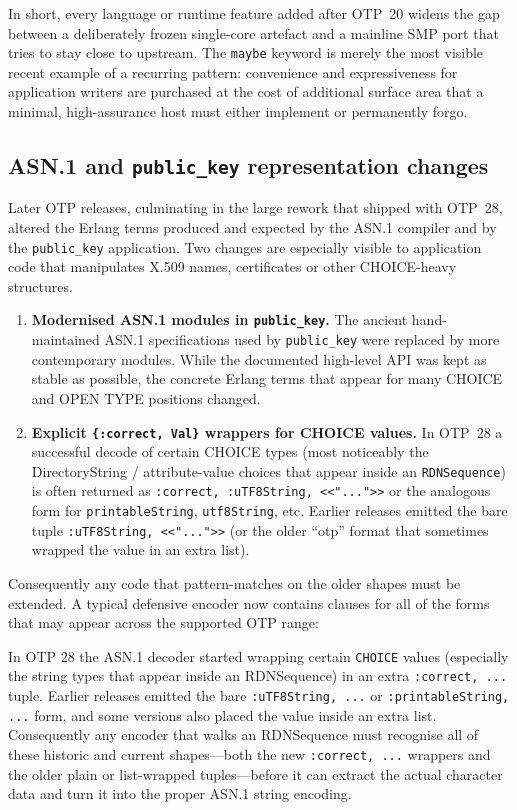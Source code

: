 \documentclass{article}
\begin{document}
In short, every language or runtime feature added after OTP~20 widens the gap between a deliberately frozen single-core artefact and a mainline SMP port that tries to stay close to upstream.
The \texttt{maybe} keyword is merely the most visible recent example of a recurring pattern: convenience and expressiveness for application writers are purchased at the cost of additional surface area that a minimal, high-assurance host must either implement or permanently forgo.

\subsection{ASN.1 and \texttt{public\_key} representation changes}

Later OTP releases, culminating in the large rework that shipped with OTP~28, altered the Erlang terms produced and expected by the ASN.1 compiler and by the \texttt{public\_key} application.
Two changes are especially visible to application code that manipulates X.509 names, certificates or other CHOICE-heavy structures.

\begin{enumerate}
  \item \textbf{Modernised ASN.1 modules in \texttt{public\_key}.}
    The ancient hand-maintained ASN.1 specifications used by \texttt{public\_key} were replaced by more contemporary modules.
    While the documented high-level API was kept as stable as possible, the concrete Erlang terms that appear for many CHOICE and OPEN TYPE positions changed.

  \item \textbf{Explicit \texttt{\{:correct, Val\}} wrappers for CHOICE values.}
    In OTP~28 a successful decode of certain CHOICE types (most noticeably the DirectoryString / attribute-value choices that appear inside an \texttt{RDNSequence}) is often returned as
    \texttt{{:correct, {:uTF8String, <<"...">>}}}
    or the analogous form for \texttt{printableString}, \texttt{utf8String}, etc.
    Earlier releases emitted the bare tuple
    \texttt{{:uTF8String, <<"...">>}}
    (or the older ``otp'' format that sometimes wrapped the value in an extra list).
\end{enumerate}

Consequently any code that pattern-matches on the older shapes must be extended.
A typical defensive encoder now contains clauses for all of the forms that may appear across the supported OTP range:

In OTP 28 the ASN.1 decoder started wrapping certain \texttt{CHOICE} values (especially the string types that
appear inside an RDNSequence) in an extra \texttt{{:correct, ...}} tuple. Earlier releases emitted the
bare \texttt{{:uTF8String, ...}} or \texttt{{:printableString, ...}} form, and some versions also placed the value
inside an extra list. Consequently any encoder that walks an RDNSequence must recognise all of
these historic and current shapes—both the new \texttt{{:correct, ...}} wrappers and the older plain or
list-wrapped tuples—before it can extract the actual character data and turn it into the proper ASN.1 string encoding.
\end{document}
